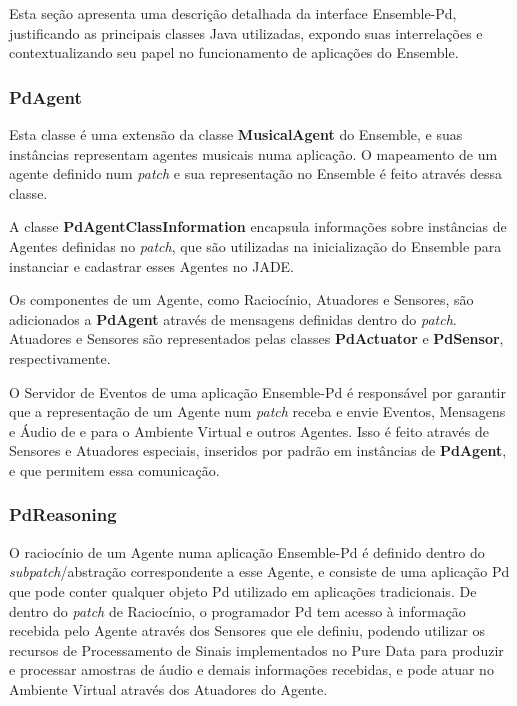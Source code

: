 \documentclass[a4paper, 11pt, twoside]{article}
\begin{document}
\begin{multicols}{2}
Esta seção apresenta uma descrição detalhada da interface Ensemble-Pd,
justificando as principais classes Java utilizadas, expondo suas 
interrelações e contextualizando seu papel no funcionamento de aplicações
do Ensemble.

\subsubsection{PdAgent}

Esta classe é uma extensão da classe \textbf{MusicalAgent} do Ensemble,
e suas instâncias representam agentes musicais numa aplicação.
O mapeamento de um agente definido num \textit{patch} e sua representação no 
Ensemble é feito através dessa classe.

A classe \textbf{PdAgentClassInformation} encapsula informações sobre
instâncias de Agentes definidas no \textit{patch}, que são utilizadas na
inicialização do Ensemble para instanciar e cadastrar esses Agentes no
JADE.

Os componentes de um Agente, como Raciocínio, Atuadores e Sensores, são
adicionados a \textbf{PdAgent} através de mensagens definidas dentro do
\textit{patch}. Atuadores e Sensores são representados pelas classes 
\textbf{PdActuator} e \textbf{PdSensor}, respectivamente.

O Servidor de Eventos de uma aplicação Ensemble-Pd é responsável por garantir 
que a representação de um Agente num \textit{patch} receba e envie Eventos, 
Mensagens e Áudio de e para o Ambiente Virtual e outros Agentes. Isso é feito
através de Sensores e Atuadores especiais, inseridos por padrão em instâncias
de \textbf{PdAgent}, e que permitem essa comunicação.

\subsubsection{PdReasoning}

O raciocínio de um Agente numa aplicação Ensemble-Pd é definido dentro do
\textit{subpatch}/abstração correspondente a esse Agente, e consiste de
uma aplicação Pd que pode conter qualquer objeto Pd utilizado em aplicações
tradicionais. De dentro do \textit{patch} de Raciocínio, o programador Pd tem 
acesso à informação recebida pelo Agente através dos Sensores que ele definiu,
podendo utilizar os recursos de Processamento de Sinais implementados no Pure
Data para produzir e processar amostras de áudio e demais informações 
recebidas, e pode atuar no Ambiente Virtual através dos Atuadores do Agente.


\end{multicols}
\end{document}
